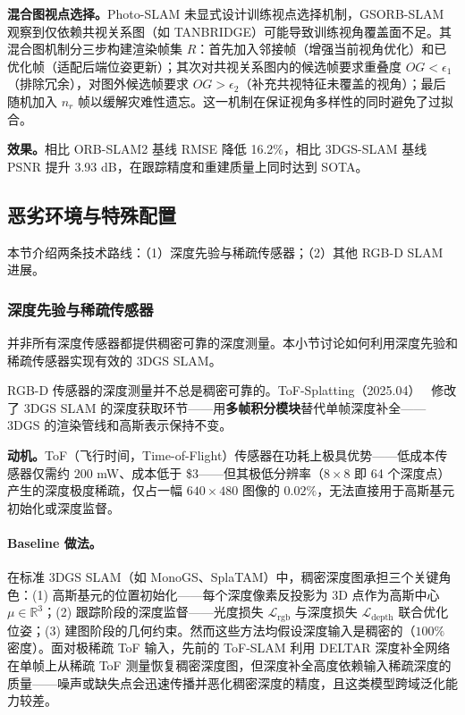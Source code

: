 \textbf{混合图视点选择。}Photo-SLAM 未显式设计训练视点选择机制，GSORB-SLAM 观察到仅依赖共视关系图（如 TANBRIDGE）可能导致训练视角覆盖面不足。其混合图机制分三步构建渲染帧集 $R$：首先加入邻接帧（增强当前视角优化）和已优化帧（适配后端位姿更新）；其次对共视关系图内的候选帧要求重叠度 $OG < \epsilon_1$（排除冗余），对图外候选帧要求 $OG > \epsilon_2$（补充共视特征未覆盖的视角）；最后随机加入 $n_r$ 帧以缓解灾难性遗忘。这一机制在保证视角多样性的同时避免了过拟合。

\textbf{效果。}相比 ORB-SLAM2 基线 RMSE 降低 16.2\%，相比 3DGS-SLAM 基线 PSNR 提升 3.93 dB，在跟踪精度和重建质量上同时达到 SOTA。

\subsection{恶劣环境与特殊配置}
\label{ss:15_3}

本节介绍两条技术路线：（1）深度先验与稀疏传感器；（2）其他 RGB-D SLAM 进展。

\subsubsection{深度先验与稀疏传感器}

并非所有深度传感器都提供稠密可靠的深度测量。本小节讨论如何利用深度先验和稀疏传感器实现有效的 3DGS SLAM。

RGB-D 传感器的深度测量并不总是稠密可靠的。ToF-Splatting（2025.04）~\cite{2504_16545} 修改了 3DGS SLAM 的深度获取环节——用\textbf{多帧积分模块}替代单帧深度补全——3DGS 的渲染管线和高斯表示保持不变。

\textbf{动机。}ToF（飞行时间，Time-of-Flight）传感器在功耗上极具优势——低成本传感器仅需约 $200$ mW、成本低于 \$3——但其极低分辨率（$8 \times 8$ 即 64 个深度点）产生的深度极度稀疏，仅占一幅 $640 \times 480$ 图像的 $0.02\%$，无法直接用于高斯基元初始化或深度监督。

\paragraph{Baseline 做法。}在标准 3DGS SLAM（如 MonoGS、SplaTAM）中，稠密深度图承担三个关键角色：(1) 高斯基元的位置初始化——每个深度像素反投影为 3D 点作为高斯中心 $\mu \in \mathbb{R}^3$；(2) 跟踪阶段的深度监督——光度损失 $\mathcal{L}_{\text{rgb}}$ 与深度损失 $\mathcal{L}_{\text{depth}}$ 联合优化位姿；(3) 建图阶段的几何约束。然而这些方法均假设深度输入是稠密的（$100\%$ 密度）。面对极稀疏 ToF 输入，先前的 ToF-SLAM 利用 DELTAR 深度补全网络在单帧上从稀疏 ToF 测量恢复稠密深度图，但深度补全高度依赖输入稀疏深度的质量——噪声或缺失点会迅速传播并恶化稠密深度的精度，且这类模型跨域泛化能力较差。

